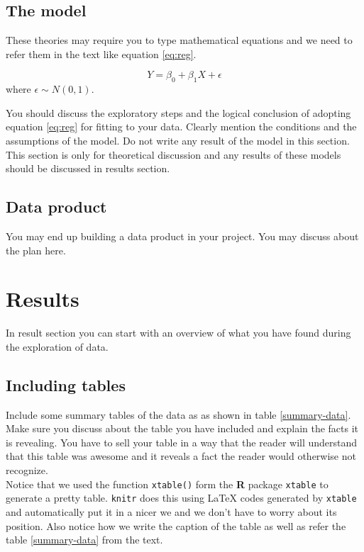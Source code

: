 \documentclass{article}\usepackage[]{graphicx}\usepackage[]{color}
\begin{document}
\subsection{The model}
These theories may require you to type mathematical equations and we need to refer them in the text like equation \ref{eq:reg}.

\begin{equation} \label{eq:reg}
 Y = \beta_0 + \beta_1 X + \epsilon
\end{equation}
where $\epsilon \sim N(0,1)$.

You should discuss the exploratory steps and the logical conclusion of adopting equation \ref{eq:reg} for fitting to your data. Clearly mention the conditions and the assumptions of the model. Do not write any result of the model in this section. This section is only for theoretical discussion and any results of these models should be discussed in results section.

\subsection{Data product} You may end up building a data product in your project. You may discuss about the plan here.

\section{Results} In result section you can start with an overview of what you have found during the exploration of data. 

\subsection{Including tables}
Include some summary tables of the data as as shown in table \ref{summary-data}. Make sure you discuss about the table you have included and explain the facts it is revealing. You have to sell your table in a way that the reader will understand that this table was awesome and it reveals a fact the reader would otherwise not recognize.\\

Notice that we used the function \texttt{xtable()} form the \textbf{R} package \texttt{xtable} \cite{xtab} to generate a pretty table. \texttt{knitr} does this using \LaTeX{} codes generated by \texttt{xtable} and automatically put it in a nicer we and we don't have to worry about its position. Also notice how we write the caption of the table as well as refer the table \ref{summary-data} from the text.
\end{document}
